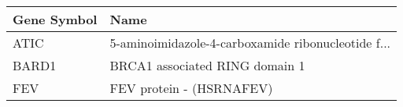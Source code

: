 \begin{tabular}{ll}
\toprule
Gene Symbol &                                               Name \\
\midrule
       ATIC & 5-aminoimidazole-4-carboxamide ribonucleotide f... \\
      BARD1 &                     BRCA1 associated RING domain 1 \\
        FEV &                           FEV protein - (HSRNAFEV) \\
\bottomrule
\end{tabular}
